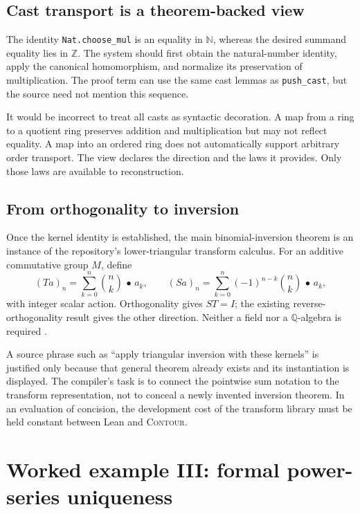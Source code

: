 \documentclass[11pt,a4paper]{article}
\newcommand{\NN}{\mathbb N}
\newcommand{\ZZ}{\mathbb Z}
\newcommand{\QQ}{\mathbb Q}
\newcommand{\codeid}[1]{\nolinkurl{#1}}
\newcommand{\contour}{\textsc{Contour}}
\begin{document}
\subsection{Cast transport is a theorem-backed view}

The identity \codeid{Nat.choose_mul} is an equality in $\NN$, whereas the desired summand equality lies in $\ZZ$. The system should first obtain the natural-number identity, apply the canonical homomorphism, and normalize its preservation of multiplication. The proof term can use the same cast lemmas as \codeid{push_cast}, but the source need not mention this sequence.

It would be incorrect to treat all casts as syntactic decoration. A map from a ring to a quotient ring preserves addition and multiplication but may not reflect equality. A map into an ordered ring does not automatically support arbitrary order transport. The view declares the direction and the laws it provides. Only those laws are available to reconstruction.

\subsection{From orthogonality to inversion}

Once the kernel identity is established, the main binomial-inversion theorem is an instance of the repository's lower-triangular transform calculus. For an additive commutative group $M$, define
\[
 (Ta)_n=\sum_{k=0}^{n}\binom nk\,\mathbin{\bullet}\,a_k,
 \qquad
 (Sa)_n=\sum_{k=0}^{n}(-1)^{n-k}\binom nk\,\mathbin{\bullet}\,a_k,
\]
with integer scalar action. Orthogonality gives $ST=I$; the existing reverse-orthogonality result gives the other direction. Neither a field nor a $\QQ$-algebra is required \cite{srcbinomial}.

A source phrase such as ``apply triangular inversion with these kernels'' is justified only because that general theorem already exists and its instantiation is displayed. The compiler's task is to connect the pointwise sum notation to the transform representation, not to conceal a newly invented inversion theorem. In an evaluation of concision, the development cost of the transform library must be held constant between Lean and \contour{}.

\section{Worked example III: formal power-series uniqueness}
\label{sec:series}
\end{document}
